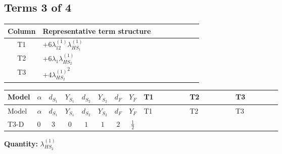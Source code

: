 \documentclass[8pt]{article}
\begin{document}
\begin{landscape}
\subsection*{Terms 3 of 4}
\begin{center}
\begin{tabular}{@{}c >{\raggedright\arraybackslash}p{0.82\linewidth}@{}}
\toprule
Column & Representative term structure \\
\midrule
T1 & \(\displaystyle +6 {\lambda_{12}^{(1)}} {\lambda_{HS_1}^{(1)}}\) \\
\midrule
T2 & \(\displaystyle +6 {\lambda_1} {\lambda_{HS_2}^{(1)}}\) \\
\midrule
T3 & \(\displaystyle +4 {\lambda_{HS_2}^{(1)}}^2\) \\
\midrule
\bottomrule
\end{tabular}
\end{center}
\smallskip
\tiny
\begin{longtable}{@{}llcccccc >{\raggedright\arraybackslash}p{0.21\linewidth} >{\raggedright\arraybackslash}p{0.21\linewidth} >{\raggedright\arraybackslash}p{0.21\linewidth}@{}}
\toprule
Model & $\alpha$ & $d_{S_1}$ & $Y_{S_1}$ & $d_{S_2}$ & $Y_{S_2}$ & $d_F$ & $Y_F$ & T1 & T2 & T3 \\
\midrule
\endfirsthead
\toprule
Model & $\alpha$ & $d_{S_1}$ & $Y_{S_1}$ & $d_{S_2}$ & $Y_{S_2}$ & $d_F$ & $Y_F$ & T1 & T2 & T3 \\
\midrule
\endhead
T3-D & $0$ & $3$ & $0$ & $1$ & $1$ & $2$ & $\frac{1}{2}$ & \scriptsize\adjustbox{max width=\linewidth}{$\begin{gathered} +6 {\lambda_{12}^{(1)}} {\lambda_{HS_1}^{(1)}}\end{gathered}$} & \scriptsize\adjustbox{max width=\linewidth}{$\begin{gathered} +6 {\lambda_1} {\lambda_{HS_2}^{(1)}}\end{gathered}$} & \scriptsize\adjustbox{max width=\linewidth}{$\begin{gathered} +4 {\lambda_{HS_2}^{(1)}}^2\end{gathered}$} \\
\midrule
\bottomrule
\end{longtable}
\clearpage
\noindent\textbf{Quantity: }$\lambda_{HS_2}^{(1)}$\par\smallskip

\end{landscape}
\end{document}
